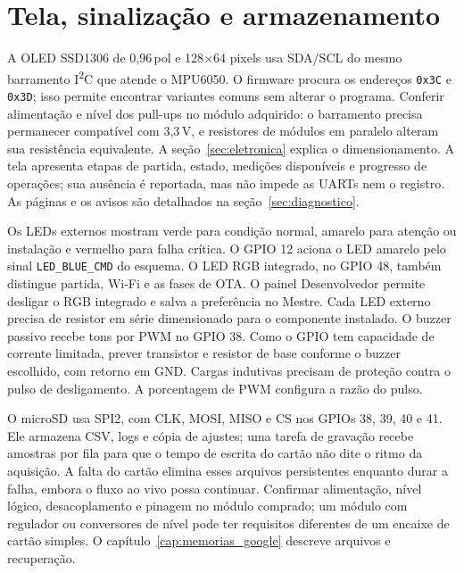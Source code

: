 \section{Tela, sinalização e armazenamento}
A OLED SSD1306 de 0,96\,pol e 128$\times$64 pixels usa SDA/SCL do mesmo barramento I\textsuperscript{2}C que atende o MPU6050. O firmware procura os endereços \texttt{0x3C} e \texttt{0x3D}; isso permite encontrar variantes comuns sem alterar o programa. Conferir alimentação e nível dos pull-ups no módulo adquirido: o barramento precisa permanecer compatível com 3,3\,V, e resistores de módulos em paralelo alteram sua resistência equivalente. A seção~\ref{sec:eletronica} explica o dimensionamento. A tela apresenta etapas de partida, estado, medições disponíveis e progresso de operações; sua ausência é reportada, mas não impede as UARTs nem o registro. As páginas e os avisos são detalhados na seção~\ref{sec:diagnostico}.

Os LEDs externos mostram verde para condição normal, amarelo para atenção ou instalação e vermelho para falha crítica. O GPIO 12 aciona o LED amarelo pelo sinal \texttt{LED\_BLUE\_CMD} do esquema. O LED RGB integrado, no GPIO 48, também distingue partida, Wi-Fi e as fases de OTA. O painel Desenvolvedor permite desligar o RGB integrado e salva a preferência no Mestre. Cada LED externo precisa de resistor em série dimensionado para o componente instalado. O buzzer passivo recebe tons por PWM no GPIO 38. Como o GPIO tem capacidade de corrente limitada, prever transistor e resistor de base conforme o buzzer escolhido, com retorno em GND. Cargas indutivas precisam de proteção contra o pulso de desligamento. A porcentagem de PWM configura a razão do pulso.

O microSD usa SPI2, com CLK, MOSI, MISO e CS nos GPIOs 38, 39, 40 e 41. Ele armazena CSV, logs e cópia de ajustes; uma tarefa de gravação recebe amostras por fila para que o tempo de escrita do cartão não dite o ritmo da aquisição. A falta do cartão elimina esses arquivos persistentes enquanto durar a falha, embora o fluxo ao vivo possa continuar. Confirmar alimentação, nível lógico, desacoplamento e pinagem no módulo comprado; um módulo com regulador ou conversores de nível pode ter requisitos diferentes de um encaixe de cartão simples. O capítulo~\ref{cap:memorias_google} descreve arquivos e recuperação.


